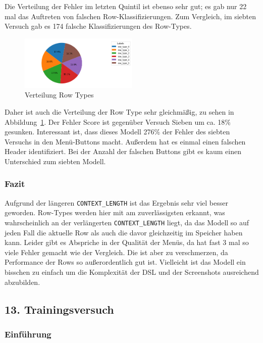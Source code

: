 \documentclass[pdftex,a4paper,halfparskip, article]{scrartcl}
\begin{document}
Die Verteilung der Fehler im letzten Quintil ist ebenso sehr gut; es gab nur 22 mal das Auftreten von falschen Row-Klassifizierungen. Zum Vergleich, im siebten Versuch gab es 174 falsche Klassifizierungen des Row-Types.

\begin{figure}[h]
\centering
\includegraphics[width=0.5\textwidth]{predictions_bin15_predicted_row_type_distribution}
\caption{Verteilung Row Types}
\label{fig:bin15_row_type}
\end{figure}

Daher ist auch die Verteilung der Row Type sehr gleichmäßig, zu sehen in Abbildung~\ref{fig:bin15_row_type}. 
Der Fehler Score ist gegenüber Versuch Sieben um ca. 18\% gesunken. 
Interessant ist, dass dieses Modell 276\% der Fehler des siebten Versuchs in den Menü-Buttons macht. Außerdem hat es einmal einen falschen Header identifiziert. Bei der Anzahl der falschen Buttons gibt es kaum einen Unterschied zum siebten Modell.

\subsubsection*{Fazit}
Aufgrund der längeren \texttt{CONTEXT\_LENGTH} ist das Ergebnis sehr viel besser geworden. Row-Types werden hier mit am zuverlässigsten erkannt, was wahrscheinlich an der verlängerten \texttt{CONTEXT\_LENGTH} liegt, da das Modell so auf jeden Fall die aktuelle Row als auch die davor gleichzeitig im Speicher haben kann. Leider gibt es Abspriche in der Qualität der Menüs, da hat fast 3 mal so viele Fehler gemacht wie der Vergleich. Die ist aber zu verschmerzen, da Performance der Rows so außerordentlich gut ist. Vielleicht ist das Modell ein bisschen zu einfach um die Komplexität der DSL und der Screenshots ausreichend abzubilden. 

\subsection{13. Trainingsversuch}


\subsubsection*{Einführung}
\end{document}
